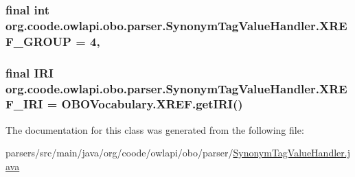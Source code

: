 \hypertarget{classorg_1_1coode_1_1owlapi_1_1obo_1_1parser_1_1_synonym_tag_value_handler_a8157f2a65073ab74daedb7e8ce33e3d7}{
\subsubsection[{X\-R\-E\-F\-\_\-\-G\-R\-O\-U\-P}]{\setlength{\rightskip}{0pt plus 5cm}final int org.\-coode.\-owlapi.\-obo.\-parser.\-Synonym\-Tag\-Value\-Handler.\-X\-R\-E\-F\-\_\-\-G\-R\-O\-U\-P = 4\hspace{0.3cm}{\ttfamily [static]}, {\ttfamily [private]}}}\label{classorg_1_1coode_1_1owlapi_1_1obo_1_1parser_1_1_synonym_tag_value_handler_a8157f2a65073ab74daedb7e8ce33e3d7}
\hypertarget{classorg_1_1coode_1_1owlapi_1_1obo_1_1parser_1_1_synonym_tag_value_handler_a57fda867a26e9336c4c52b1d08ef62bb}{
\subsubsection[{X\-R\-E\-F\-\_\-\-I\-R\-I}]{\setlength{\rightskip}{0pt plus 5cm}final {\bf I\-R\-I} org.\-coode.\-owlapi.\-obo.\-parser.\-Synonym\-Tag\-Value\-Handler.\-X\-R\-E\-F\-\_\-\-I\-R\-I = O\-B\-O\-Vocabulary.\-X\-R\-E\-F.\-get\-I\-R\-I()\hspace{0.3cm}{\ttfamily [static]}}}\label{classorg_1_1coode_1_1owlapi_1_1obo_1_1parser_1_1_synonym_tag_value_handler_a57fda867a26e9336c4c52b1d08ef62bb}


The documentation for this class was generated from the following file\-:\begin{DoxyCompactItemize}
\item 
parsers/src/main/java/org/coode/owlapi/obo/parser/\hyperlink{_synonym_tag_value_handler_8java}{Synonym\-Tag\-Value\-Handler.\-java}\end{DoxyCompactItemize}
